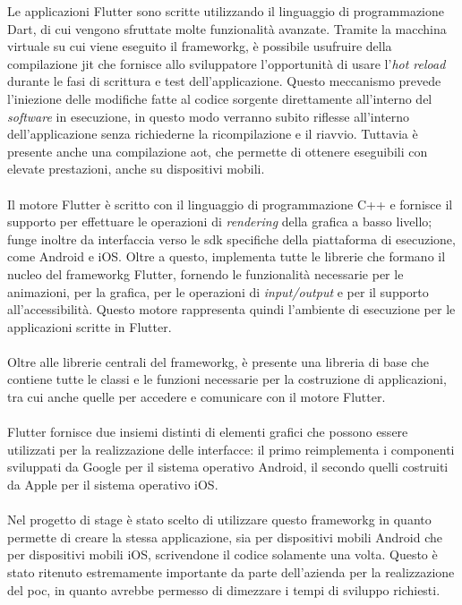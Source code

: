 Le applicazioni Flutter sono scritte utilizzando il linguaggio di programmazione Dart, di cui vengono sfruttate molte funzionalità avanzate. Tramite la macchina virtuale su cui viene eseguito il \gls{frameworkg}, è possibile usufruire della compilazione \gls{jit}\glsfirstoccur{} che fornisce allo sviluppatore l'opportunità di usare l'\textit{hot reload} durante le fasi di scrittura e test dell'applicazione. Questo meccanismo prevede l'iniezione delle modifiche fatte al codice sorgente direttamente all'interno del \textit{software} in esecuzione, in questo modo verranno subito riflesse all'interno dell'applicazione senza richiederne la ricompilazione e il riavvio. Tuttavia è presente anche una compilazione \gls{aot}\glsfirstoccur{}, che permette di ottenere eseguibili con elevate prestazioni, anche su dispositivi mobili.
\\\\
Il motore Flutter è scritto con il linguaggio di programmazione C++ e fornisce il supporto per effettuare le operazioni di \textit{rendering} della grafica a basso livello; funge inoltre da interfaccia verso le \gls{sdk} specifiche della piattaforma di esecuzione, come Android e iOS. Oltre a questo, implementa tutte le librerie che formano il nucleo del \gls{frameworkg} Flutter, fornendo le funzionalità necessarie per le animazioni, per la grafica, per le operazioni di \textit{input/output} e per il supporto all'accessibilità. Questo motore rappresenta quindi l'ambiente di esecuzione per le applicazioni scritte in Flutter.
\\\\
Oltre alle librerie centrali del \gls{frameworkg}, è presente una libreria di base che contiene tutte le classi e le funzioni necessarie per la costruzione di applicazioni, tra cui anche quelle per accedere e comunicare con il motore Flutter.
\\\\
Flutter fornisce due insiemi distinti di elementi grafici che possono essere utilizzati per la realizzazione delle interfacce: il primo reimplementa i componenti sviluppati da Google per il sistema operativo Android, il secondo quelli costruiti da Apple per il sistema operativo iOS.
\\\\
Nel progetto di stage è stato scelto di utilizzare questo \gls{frameworkg} in quanto permette di creare la stessa applicazione, sia per dispositivi mobili Android che per dispositivi mobili iOS, scrivendone il codice solamente una volta. Questo è stato ritenuto estremamente importante da parte dell'azienda per la realizzazione del \gls{poc}, in quanto avrebbe permesso di dimezzare i tempi di sviluppo richiesti.

